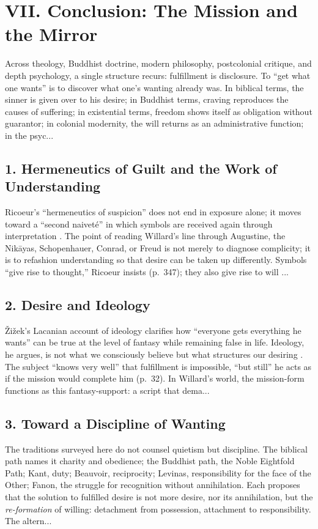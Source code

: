 \section*{VII. Conclusion: The Mission and the Mirror}
\label{sec:vii-conclusion-the-mission-and-the-mirror}

Across theology, Buddhist doctrine, modern philosophy, postcolonial critique, and depth psychology, a single structure recurs: fulfillment is disclosure. To ``get what one wants'' is to discover what one’s wanting already was. In biblical terms, the sinner is given over to his desire; in Buddhist terms, craving reproduces the causes of suffering; in existential terms, freedom shows itself as obligation without guarantor; in colonial modernity, the will returns as an administrative function; in the psyc...
\subsection*{1. Hermeneutics of Guilt and the Work of Understanding}
\label{ssec:1-hermeneutics-of-guilt-and-the-work-of-understanding}
Ricoeur’s ``hermeneutics of suspicion'' does not end in exposure alone; it moves toward a ``second naivet{\'e}'' in which symbols are received again through interpretation \parencite{RicoeurSymbol1970}. The point of reading Willard’s line through Augustine, the Nik{\={a}}yas, Schopenhauer, Conrad, or Freud is not merely to diagnose complicity; it is to refashion understanding so that desire can be taken up differently. Symbols ``give rise to thought,'' Ricoeur insists (p.~347); they also give rise to will ...
\subsection*{2. Desire and Ideology}
\label{ssec:2-desire-and-ideology}
{\v{Z}}i{\v{z}}ek’s Lacanian account of ideology clarifies how ``everyone gets everything he wants'' can be true at the level of fantasy while remaining false in life. Ideology, he argues, is not what we consciously believe but what structures our desiring \parencite{ZizekSublime1999}. The subject ``knows very well'' that fulfillment is impossible, ``but still'' he acts as if the mission would complete him (p.~32). In Willard’s world, the mission-form functions as this fantasy-support: a script that dema...
\subsection*{3. Toward a Discipline of Wanting}
\label{ssec:3-toward-a-discipline-of-wanting}
The traditions surveyed here do not counsel quietism but discipline. The biblical path names it charity and obedience; the Buddhist path, the Noble Eightfold Path; Kant, duty; Beauvoir, reciprocity; Levinas, responsibility for the face of the Other; Fanon, the struggle for recognition without annihilation. Each proposes that the solution to fulfilled desire is not more desire, nor its annihilation, but the \emph{re-formation} of willing: detachment from possession, attachment to responsibility. The altern...
